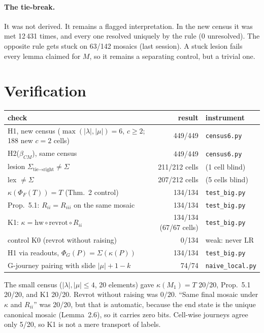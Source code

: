 \documentclass[11pt]{article}
\theoremstyle{definition}
\begin{document}
\paragraph{The tie-break.} It was not derived. It remains a flagged interpretation. In the new census it was met
12\,431 times, and every one resolved uniquely by the rule (0 unresolved). The opposite rule gets stuck on 63/142
mosaics (last session). A stuck lesion fails every lemma claimed for $M$, so it remains a separating control,
but a trivial one.

\section{Verification}
\begin{center}
\begin{tabular}{lrl}
\toprule
check & result & instrument\\
\midrule
H1, new census ($\max(|\lambda|,|\mu|)=6$, $c\ge2$; 188 new $c=2$ cells) & 449/449 & \texttt{census6.py}\\
H2($\beta_{CM}$), same census & 449/449 & \texttt{census6.py}\\
\quad lesion $\Sigma_{\text{tie}\to\text{right}}\neq\Sigma$ & 211/212 cells & (1 cell blind)\\
\quad lex $\neq\Sigma$ & 207/212 cells & (5 cells blind)\\
$\kappa(\Phi_F(T))=T$ (Thm.~2 control) & 134/134 & \texttt{test\_big.py}\\
Prop.~5.1: $R_{ii}=R_{iii}$ on the same mosaic & 134/134 & \texttt{test\_big.py}\\
K1: $\kappa=\mathrm{hw}\circ\mathrm{revrot}\circ R_{ii}$ & 134/134 (67/67 cells) & \texttt{test\_big.py}\\
\quad control K0 (revrot without raising) & 0/134 & weak: never LR\\
H1 via readouts, $\Phi_G(P)=\Sigma(\kappa(P))$ & 134/134 & \texttt{test\_big.py}\\
G-journey pairing with slide $|\mu|+1-k$ & 74/74 & \texttt{naive\_local.py}\\
\bottomrule
\end{tabular}
\end{center}
The small census ($|\lambda|,|\mu|\le4$, 20 elements) gave $\kappa(M_1)=T$ 20/20, Prop.~5.1 20/20, and K1 20/20. Revrot
without raising was $0/20$. ``Same final mosaic under $\kappa$ and $R_{ii}$'' was 20/20, but that is automatic,
because the end state is the unique canonical mosaic (Lemma~2.6), so it carries zero bits. Cell-wise journeys agree only
5/20, so K1 is not a mere transport of labels.
\end{document}
